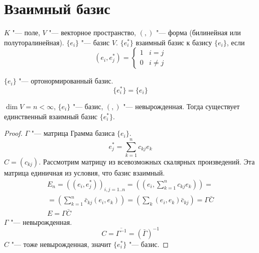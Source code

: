 \section{Взаимный базис}

\begin{Def}
	$K$ "--- поле, $V$ "---  векторное пространство, $(,)$ "--- форма (билинейная или полуторалинейная).
	$\{e_i\}$ "--- базис $V$.
	$\{e_i^*\}$  взаимный базис к базису $\{e_i\}$, если
	\[ (e_i, e_j^*) = \begin{cases} 1 & i = j \\ 0 & i \ne j \end{cases} \]
\end{Def}

\begin{exmp}
	$\{e_i\}$ "--- ортонормированный базис.
	\[ \{e_i^*\} = \{e_i\} \]
\end{exmp}

\begin{theorem}
	$\dim V = n < \infty$, $\{e_i\}$ "--- базис, $(, )$ "--- невырожденная.
	Тогда существует единственный взаимный базис $\{e_i^*\}$.
\end{theorem}

\begin{proof}
	$\Gamma$ "--- матрица Грамма базиса $\{e_i\}$.
	\[ e_j^* = \sum_{k=1}^n c_{kj} e_k \]
	$C = (c_{kj})$.
	Рассмотрим матрицу из всевозможных скалярных произведений.
	Эта матрица единичная из условия, что базис взаимный.
	\begin{gather*}
		E_n = ((e_i, e_j^*))_{i, j = 1..n} = \left(\left(e_i, \sum_{k = 1}^n c_{kj}e_k\right)\right) = \\
		= \left(\sum_{k=1}^n \bar c_{kj} (e_i, e_k)\right) = \left(\sum_{k} (e_i, e_k) \bar c_{kj} \right) = \Gamma \bar C \\
		E = \Gamma \bar C
	\end{gather*}
	$\Gamma$ "--- невырожденная.
	\[ C = \overline{\Gamma^{-1}} = (\bar \Gamma)^{-1} \]
	$C$ "--- тоже невырожденная, значит $\{e_i^*\}$ "--- базис.
\end{proof}